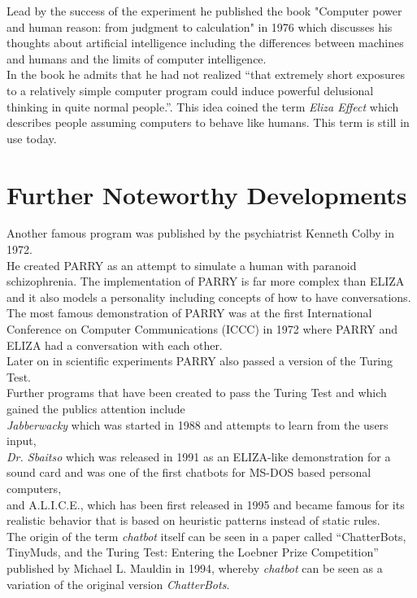 Lead by the success of the experiment he published the book "Computer power and human reason: from judgment to calculation" in 1976 which discusses his thoughts about artificial intelligence including the differences between machines and humans and the limits of computer intelligence.
\\
In the book he admits that he had not realized ``that extremely short exposures to a relatively simple computer program could induce powerful delusional thinking in quite normal people.''\cite{bbcnowthen}. This idea coined the term \emph{Eliza Effect} which describes people assuming computers to behave like humans. This term is still in use today.


\section{Further Noteworthy Developments}

Another famous program was published by the psychiatrist Kenneth Colby in 1972.
\\
He created PARRY as an attempt to simulate a human with paranoid schizophrenia. The implementation of PARRY is far more complex than ELIZA and it also models a personality including concepts of how to have conversations.
\\
The most famous demonstration of PARRY was at the first International Conference on Computer Communications (ICCC) in 1972 where PARRY and ELIZA had a conversation with each other.\cite{internethistory}
\\
Later on in scientific experiments PARRY also passed a version of the Turing Test.
\\

Further programs that have been created to pass the Turing Test and which gained the publics attention include
\\
\emph{Jabberwacky} which was started in 1988 and attempts to learn from the users input\cite{jabberwacky},
\\
\emph{Dr. Sbaitso} which was released in 1991 as an ELIZA-like demonstration for a sound card and was one of the first chatbots for MS-DOS based personal computers\cite{pcmag},
\\
and A.L.I.C.E., which has been first released in 1995 and became famous for its realistic behavior that is based on heuristic patterns instead of static rules\cite{approximatinglife}.
\\

The origin of the term \emph{chatbot} itself can be seen in a paper called ``ChatterBots, TinyMuds, and the Turing Test: Entering the Loebner Prize Competition'' published by Michael L. Mauldin in 1994, whereby \emph{chatbot} can be seen as a variation of the original version \emph{ChatterBots}.\cite{aiconf}
\\


